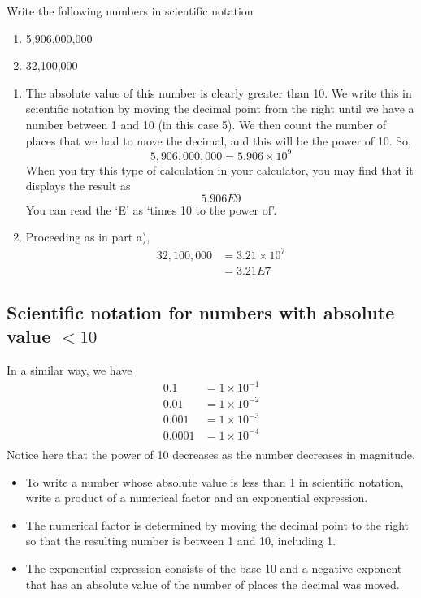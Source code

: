 \begin{myexample}
Write the following numbers in scientific notation
\begin{multicols}{2}
	\begin{enumerate}
		\item 5,906,000,000
		\item 32,100,000
	\end{enumerate} 
\end{multicols}
\end{myexample}
\begin{myProof}
	\begin{enumerate}
		\item The absolute value of this number is clearly greater than 10. We write this in scientific notation by
		moving the decimal point from the right until we have a number between 1 and 10 (in this case 5). We 
		then count the number of places that we had to move the decimal, and this will be the power of 10. So, 
		\[
			5,906,000,000 = 5.906 \times 10^9
		\]
		When you try this type of calculation in your calculator, you may find that it displays the result as
		\[
			5.906 E 9
		\]	
		You can read the `E' as `times 10 to the power of'. 
		\item Proceeding as in part a), 
		\begin{align*}
			32,100,000 & =  3.21\times 10^7 \\
			           & =  3.21 E7         
		\end{align*} 
	\end{enumerate} 
	{}
\end{myProof}

\subsection{Scientific notation for numbers with absolute value $<10$}
In a similar way, we have
\begin{align*}
	0.1    & =  1 \times 10^{-1} \\
	0.01   & =  1 \times 10^{-2} \\
	0.001  & =  1 \times 10^{-3} \\
	0.0001 & =  1 \times 10^{-4} \\
\end{align*} 
Notice here that the power of 10 decreases as the number decreases in magnitude. 

\begin{itemize}
	\item To write a number whose absolute value is less than 1 in scientific notation, write a product of 
	a numerical factor and an exponential expression.
	\item The numerical factor is determined by moving the decimal point to the right so that the resulting
	number is between 1 and 10, including 1.
	\item The exponential expression consists of the base 10 and a negative exponent that has an absolute
	value of the number of places the decimal was moved.
\end{itemize} 

